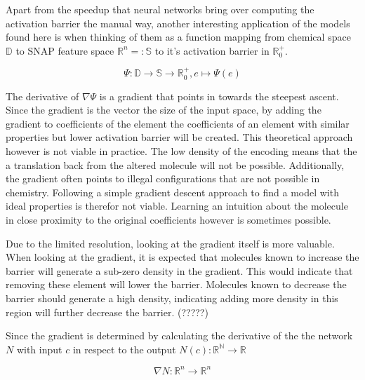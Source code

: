 Apart from the speedup that neural networks bring over computing the activation barrier the manual way,
another interesting application of the models found here is when thinking of them as a function mapping from chemical space $\mathbb{D}$ to SNAP feature space 
$\mathbb{R}^n =: \mathbb{S}$ to it's activation barrier in $\mathbb{R}^+_0$.

$$ \Psi : \mathbb{D} \to \mathbb{S} \to \mathbb{R}^+_0, e \mapsto \Psi(e) $$

The derivative of $\nabla \Psi$ is a gradient that points in towards the steepest ascent.
Since the gradient is the vector the size of the input space, by adding the gradient to coefficients of the element 
the coefficients of an element with similar properties but lower activation barrier will be created.
This theoretical approach however is not viable in practice.
The low density of the encoding means that the a translation back from the altered molecule will not be possible.
Additionally, the gradient often points to illegal configurations that are not possible in chemistry.
Following a simple gradient descent approach to find a model with ideal properties is therefor not viable.
Learning an intuition about the molecule in close proximity to the original coefficients however is sometimes possible.

Due to the limited resolution, looking at the gradient itself is more valuable.
When looking at the gradient, it is expected that molecules known to increase the barrier will generate a sub-zero density in the gradient.
This would indicate that removing these element will lower the barrier.
Molecules known to decrease the barrier should generate a high density, indicating adding more density in 
this region will further decrease the barrier. (?????)

Since the gradient is determined by calculating the derivative of the the network $N$ with input $c$ in respect to the output $N(c): \mathbb{R^N} \to \mathbb{R}$

$$
\nabla N: \mathbb{R}^n  \to \mathbb{R}^n 
$$

